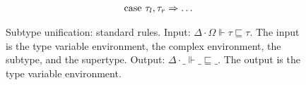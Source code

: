 \documentclass[acmsmall]{acmart}
\begin{document}
\begin{figure*}[h]
\[\begin{array}[t]{@{} l}
\end{array}
\begin{array}[t]{@{} l}
    \I \text{case } \tau_l, \tau_r \Rightarrow  \hdots
\end{array}
\]










\caption{Subtype unification: standard rules.
  \newline
  Input: $\Delta \cdot \Omega \Vdash \tau \sqsubseteq \tau$. The input is the type variable environment, the complex environment, the subtype, and the supertype. 
  \newline
  Output: $\Delta \cdot \_ \Vdash \_ \sqsubseteq \_$. The output is the type variable environment. 
}
\end{figure*}
\end{document}
